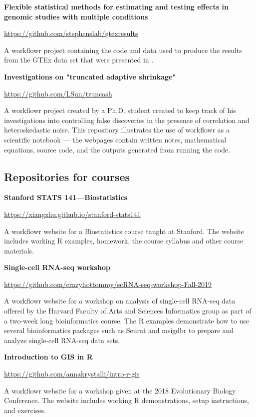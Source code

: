 \documentclass[9pt,a4paper]{extarticle}
\begin{document}
\textbf{Flexible statistical methods for estimating and testing effects
in genomic studies with multiple conditions}

\url{https://github.com/stephenslab/gtexresults}

A workflowr project containing the code and data used to produce the
results from the GTEx data set that were presented in \cite{Urbut2019}.

\textbf{Investigations on "truncated adaptive shrinkage"}

\url{https://github.com/LSun/truncash}

A workflowr project created by a Ph.D. student created to keep track of
his investigations into controlling false discoveries in the presence of
correlation and heteroskedastic noise. This repository illustrates the
use of workflowr as a scientific notebook --- the webpages contain
written notes, mathematical equations, source code, and the outputs
generated from running the code.

\subsection*{Repositories for courses}

\textbf{Stanford STATS 141—Biostatistics}

\url{https://xiangzhu.github.io/stanford-stats141}

A workflowr website for a Biostatistics course taught at Stanford. The
website includes working R examples, homework, the course syllabus and
other course materials.

\textbf{Single-cell RNA-seq workshop}

\url{https://github.com/crazyhottommy/scRNA-seq-workshop-Fall-2019}

A workflowr website for a workshop on analysis of single-cell RNA-seq
data offered by the Harvard Faculty of Arts and Sciences Informatics
group as part of a two-week long bioinformatics course. The R examples
demonstrate how to use several bioinformatics packages such as Seurat
and msigdbr to prepare and analyze single-cell RNA-seq data sets.

\textbf{Introduction to GIS in R}

\url{https://github.com/annakrystalli/intro-r-gis}

A workflowr website for a workshop given at the 2018 Evolutionary
Biology Conference. The website includes working R demonstrations, setup
instructions, and exercises.
\end{document}
